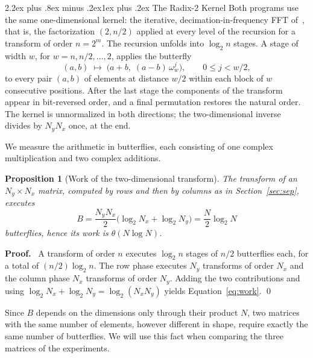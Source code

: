 \documentclass[conference,onecolumn]{IEEEtran}
\makeatletter
\renewcommand{\subsection}{\@startsection{subsection}{2}{\z@}%
  {2.2ex plus .8ex minus .2ex}{1ex plus .2ex}%
  {\normalfont\normalsize\bfseries}}
\theoremstyle{course}
\newtheorem{proposition}{Proposition}
\renewenvironment{proof}{\par\addvspace{.8ex plus .3ex}%
  \noindent\textbf{Proof.}\ \ignorespaces}%
  {\qed\par\addvspace{1.6ex plus .5ex minus .2ex}}
\makeatother
\begin{document}
\subsection{The Radix-2 Kernel}
Both programs use the same one-dimensional kernel: the iterative,
decimation-in-frequency FFT of~\cite[sec.~6.3]{alg}, that is, the
factorization $(2,n/2)$ applied at every level of the recursion for a
transform of order $n=2^m$. The recursion unfolds into $\log_2 n$ stages. A
stage of width $w$, for $w=n,n/2,\ldots,2$, applies the butterfly
\begin{equation}
 (a,b)\;\longmapsto\;\bigl(a+b,\;(a-b)\,\omega_w^{j}\bigr),
 \qquad 0\le j<w/2, \label{eq:butterfly}
\end{equation}
to every pair $(a,b)$ of elements at distance $w/2$ within each block of $w$
consecutive positions. After the last stage the components of the transform
appear in bit-reversed order, and a final permutation restores the natural
order. The kernel is unnormalized in both directions; the two-dimensional
inverse divides by $N_yN_x$ once, at the end.

We measure the arithmetic in butterflies, each consisting of one complex
multiplication and two complex additions.

\begin{proposition}[Work of the two-dimensional transform]\label{prop:work}
The transform of an $N_y\times N_x$ matrix, computed by rows and then by
columns as in Section~\ref{sec:sep}, executes
\begin{equation}
 B=\frac{N_yN_x}{2}\bigl(\log_2 N_x+\log_2 N_y\bigr)=\frac{N}{2}\log_2 N
 \label{eq:work}
\end{equation}
butterflies, hence its work is $\theta(N\log N)$.
\end{proposition}

\begin{proof}
A transform of order $n$ executes $\log_2 n$ stages of $n/2$ butterflies
each, for a total of $(n/2)\log_2 n$. The row phase executes $N_y$
transforms of order $N_x$ and the column phase $N_x$ transforms of order
$N_y$. Adding the two contributions and using
$\log_2 N_x+\log_2 N_y=\log_2(N_xN_y)$ yields Equation~\ref{eq:work}.
\end{proof}

Since $B$ depends on the dimensions only through their product $N$, two
matrices with the same number of elements, however different in shape,
require exactly the same number of butterflies. We will use this fact when
comparing the three matrices of the experiments.
\end{document}
